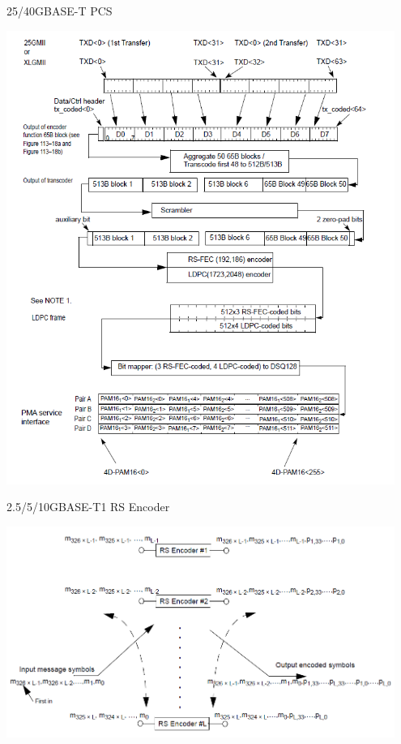 \documentclass{beamer}
\begin{document}
\begin{frame}{25/40GBASE-T PCS}
	\begin{center}
        \includegraphics[width=0.95\textwidth,height=0.85\textheight,keepaspectratio]{25-40GBASE-T-coding.png}
    \end{center}
\end{frame}

\begin{frame}{2.5/5/10GBASE-T1 RS Encoder}
	\begin{center}
        \includegraphics[width=0.95\textwidth,height=0.85\textheight,keepaspectratio]{rs-interleaver.png}
    \end{center}
\end{frame}
\end{document}
